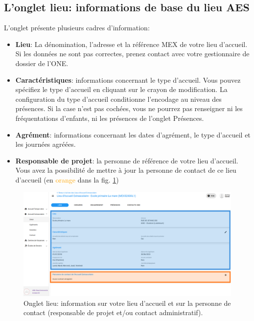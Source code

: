 \subsection{L'onglet lieu: informations de base du lieu AES}\label{ssec:aes_lieu}
L'onglet  présente plusieurs cadres d'information: 
\begin{itemize}
    \item \textbf{Lieu}: La dénomination, l'adresse et la référence MEX de votre lieu d'accueil. Si les données ne sont pas correctes, prenez contact avec votre gestionnaire de dossier de l'ONE. 
    \item \textbf{Caractéristiques}: informations concernant le type d'accueil. Vous pouvez spécifiez le type d'accueil en cliquant sur le crayon de modification. La configuration du type d'accueil conditionne l'encodage au niveau des présences. Si la case n'est pas cochées, vous ne pourrez pas renseigner ni les fréquentations d'enfants, ni les présences de l'onglet Présences. 
    \item \textbf{Agrément}: informations concernant les dates d'agrément, le type d'accueil et les journées agréées. 
    \item \textbf{Responsable de projet}: la personne de référence de votre lieu d'accueil. Vous avez la possibilité de mettre à jour la personne de contact de ce lieu d'accueil (en \textcolor{orange}{orange} dans la fig. \ref{fig:aes_lieu})
\end{itemize}

\begin{figure}[h!]
    \centering
    \includegraphics[width=15cm]{Images/aes/lieu.png}
    \caption{Onglet lieu: information sur votre lieu d'accueil et sur la personne de contact (responsable de projet et/ou contact administratif).}
    \label{fig:aes_lieu}
\end{figure}




